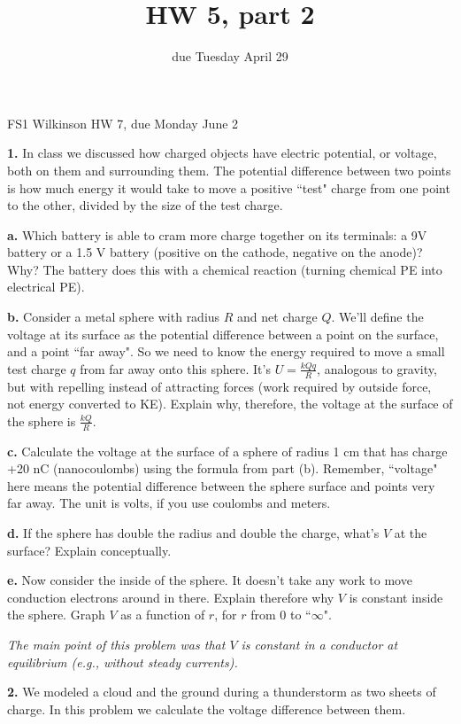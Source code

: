 \documentclass[12pt]{article}
\title{HW 5, part 2}
\date{due Tuesday April 29}
\begin{document}
\setlength{\parindent}{0pt}
\setlength{\parskip}{3mm}

FS1 Wilkinson HW 7, due Monday June 2 

\textbf{1.} In class we discussed how charged objects have electric potential, or voltage, both on them and surrounding them. The potential difference between two points is how much energy it would take to move a positive ``test" charge from one point to the other, divided by the size of the test charge.

\textbf{a.} Which battery is able to cram more charge together on its terminals: a 9V battery or a 1.5 V battery (positive on the cathode, negative on the anode)? Why? The battery does this with a chemical reaction (turning chemical PE into electrical PE). 

\textbf{b.} Consider a metal sphere with radius $R$ and net charge $Q$. We'll define the voltage at its surface as the potential difference between a point on the surface, and a point ``far away". So we need to know the energy required to move a small test charge $q$ from far away onto this sphere. It's $U=\frac{kQq}{R}$, analogous to gravity, but with repelling instead of attracting forces (work required by outside force, not energy converted to KE). Explain why, therefore, the voltage at the surface of the sphere is $\frac{kQ}{R}$. 

\textbf{c.} Calculate the voltage at the surface of a sphere of radius 1 cm that has charge +20 nC (nanocoulombs) using the formula from part (b). Remember, ``voltage" here means the potential difference between the sphere surface and points very far away. The unit is volts, if you use coulombs and meters.

\textbf{d.} If the sphere has double the radius and double the charge, what's $V$ at the surface? Explain conceptually.

\textbf{e.} Now consider the inside of the sphere. It doesn't take any work to move conduction electrons around in there. Explain therefore why $V$ is constant inside the sphere. Graph $V$ as a function of $r$, for $r$ from 0 to ``$\infty$". 

\textit{The main point of this problem was that $V$ is constant in a conductor at equilibrium (e.g., without steady currents).}

\bigskip

\textbf{2.} We modeled a cloud and the ground during a thunderstorm as two sheets of charge. In this problem we calculate the voltage difference between them.
\end{document}
